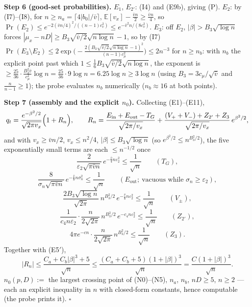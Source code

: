 \documentclass[
]{article}
\begin{document}
\textbf{Step 6 (good-set probabilities).}  $E_1$, $E_{2'}$: (I4) and
(E9b), giving (P).  $E_2$: by (I7)--(I8), for $n\ge
n_a=\lceil4|b_0|/\bar v\rceil$, $\mathbb E[v_x]-\tfrac{\bar vn}{2}\ge
\tfrac{\bar vn}{4}$, so $\Pr(E_2)\le e^{-2(\bar vn/4)^2/((n-1)c_v^2)}
\le e^{-\bar v^2n/(8c_v^2)}$.  $E_3$: off $E_2$,
$|\beta|>B_3\sqrt{\log n}$ forces $|\mu_x-nD|\ge
B_3\sqrt{\bar v/2}\sqrt{n\log n}-1$, so by (I7)
$\Pr(E_3\setminus E_2)\le2\exp\bigl(-\tfrac{2(B_3\sqrt{\bar v/2}
\sqrt{n\log n}-1)^2}{(n-1)c_\mu^2}\bigr)\le2n^{-3}$ for $n\ge n_b$:
with $n_b$ the explicit point past which
$1\le\tfrac16B_3\sqrt{\bar v/2}\sqrt{n\log n}$, the exponent is
$\ge\tfrac{25}{36}\cdot\tfrac{B_3^2\bar v}{c_\mu^2}\log n
=\tfrac{25}{36}\cdot9\log n=6.25\log n\ge3\log n$
(using $B_3=3c_\mu/\sqrt{\bar v}$ and $\tfrac{n}{n-1}\ge1$); the probe
evaluates $n_b$ numerically ($n_b\approx16$ at both points).

\textbf{Step 7 (assembly and the explicit $n_0$).}  Collecting
(E1)--(E11),
\[
  q_t=\frac{e^{-\beta^2/2}}{\sqrt{2\pi v_x}}
  \Bigl(1+R_n\Bigr),\qquad
  R_n=\frac{E_{\mathrm{in}}+E_{\mathrm{out}}-T_G}{\sqrt{2\pi/v_x}}
  +\frac{(V_++V_-)+Z_{2'}+Z_3}{\sqrt{2\pi/v_x}}\,e^{\beta^2/2},
\]
and with $v_x\ge\bar vn/2$, $v_x\le n^2/4$,
$|\beta|\le B_3\sqrt{\log n}$ (so $e^{\beta^2/2}\le n^{B_3^2/2}$), the
five exponentially small terms are each $\le n^{-1/2}$ once
\[
  \tag{N1}
  \frac{2}{\varepsilon_2\sqrt{\pi\bar v n}}\,
  e^{-\frac{\bar v}{4}n\varepsilon_2^2}\le\frac1{\sqrt n}
  \qquad(T_G),
\]
\[
  \tag{N2}
  \frac{8}{\sigma_n\sqrt{\pi\bar v n}}\,
  e^{-\frac{\bar v}{8}n\sigma_n^2}\le\frac1{\sqrt n}
  \qquad(E_{\mathrm{out}};\ \text{vacuous while }
  \sigma_n\ge\varepsilon_2),
\]
\[
  \tag{N3}
  \frac{2B_3\sqrt{\log n}}{\sqrt{2\pi}}\,n^{B_3^2/2}\,
  e^{-\frac{\bar v}{8}n\varepsilon_2^2}\le\frac1{\sqrt n}
  \qquad(V_\pm),
\]
\[
  \tag{N4}
  \frac{1}{c_4n\varepsilon_2}\cdot\frac{n}{2\sqrt{2\pi}}\,
  n^{B_3^2/2}\,e^{-c_4n\varepsilon_2^2}\le\frac1{\sqrt n}
  \qquad(Z_{2'}),
\]
\[
  \tag{N5}
  4\pi e^{-cn}\cdot\frac{n}{2\sqrt{2\pi}}\,
  n^{B_3^2/2}\le\frac1{\sqrt n}
  \qquad(Z_3).
\]
Together with (E5$'$),
\[
  |R_n|\le\frac{C_a+C_b|\beta|^3+5}{\sqrt n}
  \le\frac{(C_a+C_b+5)(1+|\beta|)^3}{\sqrt n}
  =\frac{C(1+|\beta|)^3}{\sqrt n}.
\]
$n_0(p,D):=$ the largest crossing point of (N0)--(N5), $n_a$, $n_b$,
$nD\ge5$, $n\ge2$ --- each an explicit inequality in $n$ with
closed-form constants, hence computable (the probe prints it).
\hfill$\square$
\end{document}
